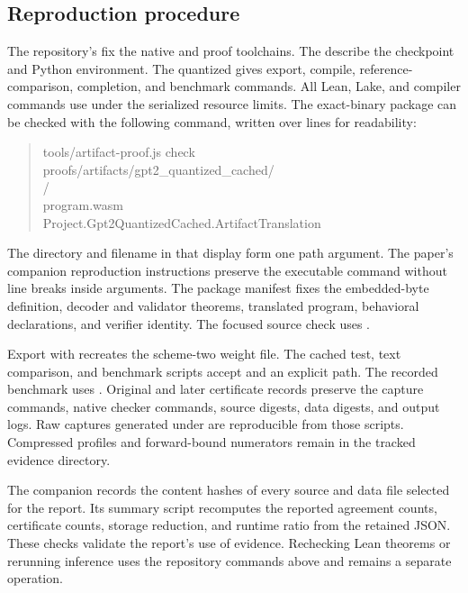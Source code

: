\subsection{Reproduction procedure}

The repository's  fix the native and proof toolchains.  The  describe the checkpoint and Python environment.  The quantized  gives export, compile, reference-comparison, completion, and benchmark commands.  All Lean, Lake, and compiler commands use  under the serialized resource limits.  The exact-binary package can be checked with the following command, written over lines for readability:

\begin{quote}\small\ttfamily
tools/artifact-proof.js check \\
proofs/artifacts/gpt2\_quantized\_cached/\\
/\\
program.wasm \\
Project.Gpt2QuantizedCached.ArtifactTranslation
\end{quote}

The directory and filename in that display form one path argument.  The paper's companion reproduction instructions preserve the executable command without line breaks inside arguments.  The package manifest fixes the embedded-byte definition, decoder and validator theorems, translated program, behavioral declarations, and verifier identity.  The focused source check uses .

Export with  recreates the scheme-two weight file.  The cached test, text comparison, and benchmark scripts accept  and an explicit  path.  The recorded benchmark uses .  Original and later certificate records preserve the capture commands, native checker commands, source digests, data digests, and output logs.  Raw captures generated under  are reproducible from those scripts.  Compressed profiles and forward-bound numerators remain in the tracked evidence directory.

The companion  records the content hashes of every source and data file selected for the report.  Its summary script recomputes the reported agreement counts, certificate counts, storage reduction, and runtime ratio from the retained JSON.  These checks validate the report's use of evidence.  Rechecking Lean theorems or rerunning inference uses the repository commands above and remains a separate operation.
